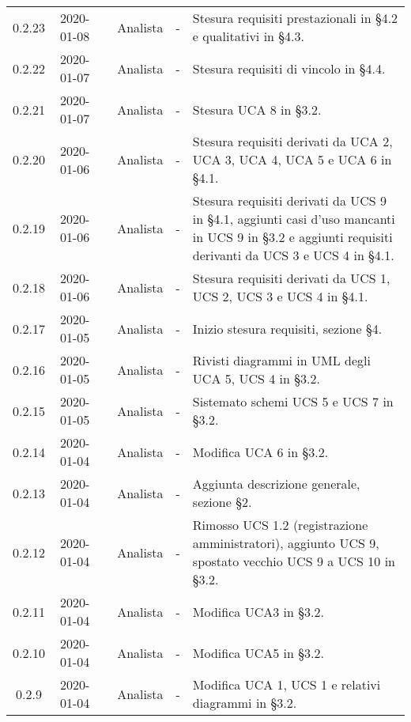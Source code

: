 {\begin{longtable}{ c c  C{2.3cm} c C{3cm} C{3.2cm}}
0.2.23 & 2020-01-08 & \DF{} & Analista & - & Stesura requisiti prestazionali in §4.2 e qualitativi in §4.3. \\

0.2.22 & 2020-01-07 & \PF{} & Analista & - & Stesura requisiti di vincolo in §4.4. \\

0.2.21 & 2020-01-07 & \PF{} & Analista & - & Stesura UCA 8 in §3.2. \\

0.2.20 & 2020-01-06 & \PF{} & Analista & - & Stesura requisiti derivati da UCA 2, UCA 3, UCA 4, UCA 5 e UCA 6 in §4.1. \\

0.2.19 & 2020-01-06 & \DF{} & Analista & - & Stesura requisiti derivati da UCS 9 in §4.1, aggiunti casi d'uso mancanti in UCS 9 in §3.2 e aggiunti requisiti derivanti da UCS 3 e UCS 4 in §4.1. \\

0.2.18 & 2020-01-06 & \CE{} & Analista & - & Stesura requisiti derivati da UCS 1, UCS 2, UCS 3 e UCS 4 in §4.1. \\

0.2.17 & 2020-01-05 & \CE{} & Analista & - & Inizio stesura requisiti, sezione §4. \\

0.2.16 & 2020-01-05 & \DF{} & Analista & - & Rivisti diagrammi in UML degli UCA 5, UCS 4 in §3.2. \\

0.2.15 & 2020-01-05 & \PF{} & Analista & - & Sistemato schemi UCS 5 e UCS 7 in §3.2. \\

0.2.14 & 2020-01-04 & \PF{} & Analista & - & Modifica UCA 6 in §3.2. \\

0.2.13 & 2020-01-04 & \CE{} & Analista & - & Aggiunta descrizione generale, sezione §2. \\

0.2.12 & 2020-01-04 & \CE{} & Analista & - & Rimosso UCS 1.2 (registrazione amministratori), aggiunto UCS 9, spostato vecchio UCS 9 a UCS 10 in §3.2. \\

0.2.11 & 2020-01-04 & \PF{} & Analista & - & Modifica UCA3 in §3.2. \\

0.2.10 & 2020-01-04 & \DF{} & Analista & - & Modifica UCA5 in §3.2. \\

0.2.9 & 2020-01-04 & \DF{} & Analista & - & Modifica UCA 1, UCS 1 e relativi diagrammi in §3.2. \\


\end{longtable}}
